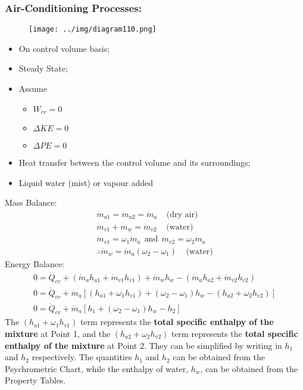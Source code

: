 \documentclass[class=report, crop=false, 12pt,a4paper]{standalone}
\numberwithin{equation}{section}
\begin{document}
\subsubsection{Air-Conditioning Processes:}
\begin{figure}[H]
  \centering
  \texttt{[image: ../img/diagram110.png]}
  \caption{}
\end{figure}
\begin{itemize}[noitemsep]
  \item On control volume basis;
  \item Steady State;
  \item Assume 
  \begin{itemize}[noitemsep]
    \item $W_{cv} = 0$
    \item $\Delta KE = 0$
    \item $\Delta PE = 0$
  \end{itemize}
  \item Heat transfer between the control volume and its surroundings;
  \item Liquid water (mist) or vapour added
\end{itemize}
Mass Balance:
\begin{gather}
  \dot{m}_{a1} = \dot{m}_{a2} = \dot{m}_{a} \ \ \ \ \ \text{(dry air)} \\[5pt]
  \dot{m}_{v1} + \dot{m}_{w} = \dot{m}_{v2} \ \ \ \ \ \text{(water)} \\[5pt]
  \dot{m}_{v1} = \omega_1\dot{m}_{a} \ \ \text{and} \ \ \dot{m}_{v2} = \omega_2\dot{m}_{a} \\[5pt]
  \therefore \dot{m}_{w} = \dot{m}_{a}(\omega_2 - \omega_1) \ \ \ \ \ \text{(water)}
\end{gather}
Energy Balance:
\begin{gather}
  0 = \dot{Q}_{cv} + (\dot{m}_{a}h_{a1} + \dot{m}_{v1}h_{v1}) + \dot{m}_{w}h_{w} - (\dot{m}_{a}h_{a2} + \dot{m}_{v2}h_{v2}) \\[5pt]
  0 = \dot{Q}_{cv} + \dot{m}_{a}\left[(h_{a1} + \omega_1h_{v1}) + (\omega_2-\omega_1)h_{w} - (h_{a2} + \omega_2h_{v2})\right] \\[5pt]
  0 = \dot{Q}_{cv} + \dot{m}_{a}[h_1 + (\omega_2-\omega_1)h_{w} - h_2]
\end{gather}
The $(h_{a1} + \omega_1h_{v1})$ term represents the \textbf{total specific enthalpy of the mixture} at Point 1, and the $(h_{a2} + \omega_2h_{v2})$ term represents the \textbf{total specific enthalpy of the mixture} at Point 2. They can be simplified by writing in $h_1$ and $h_2$ respectively. The quantities $h_1$ and $h_2$ can be obtained from the Psychrometric Chart, while the enthalpy of water, $h_w$, can be obtained from the Property Tables. \\\\
\end{document}
